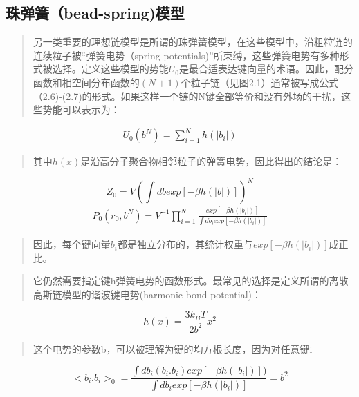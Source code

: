 \subsection{珠弹簧（bead-spring)模型}
			\begin{quotation}
				另一类重要的理想链模型是所谓的珠弹簧模型，在这些模型中，沿粗粒链的连续粒子被“弹簧电势（spring potentials)”所束缚，这些弹簧电势有多种形式被选择。定义这些模型的势能$U_{0}$是最合适表达键向量的术语。因此，配分函数和相空间分布函数的$(N+1)$个粒子链（见图2.1）通常被写成公式（2.6)-(2.7)的形式。如果这样一个链的N键全部等价和没有外场的干扰，这些势能可以表示为：
			\end{quotation} 
			\begin{equation}
			\begin{split}
			U_{0}(b^{N})= \sum_{i=1}^{N}h(|b_{i}|)
			\end{split}
			\end{equation}
			\begin{quotation}
				其中$h(x)$是沿高分子聚合物相邻粒子的弹簧电势，因此得出的结论是：
			\end{quotation}
			\begin{equation}
			Z_{0}=V(\int db exp[-\beta h(|b|)])^N 
			\end{equation}
			\begin{equation}
			\begin{split}		
			P_{0} (r_{0},b^N) =V^{-1} \prod_{i=1}^{N} \frac{exp[-\beta h(|b_{i}|)]}{\int d b_{i}exp[-\beta h(|b_{i}|)]}
			\end{split}
			\end{equation}
			\begin{quotation}
				因此，每个键向量$b_{i}$都是独立分布的，其统计权重与$exp[-\beta h(|b_{i}|)]$成正比。 
			\end{quotation}
			\begin{quotation}
				它仍然需要指定键h弹簧电势的函数形式。最常见的选择是定义所谓的离散高斯链模型的谐波键电势(harmonic bond potential)： 
			\end{quotation}
			\begin{equation}
			h(x)=\frac{3k_{B}T}{2b^2} x^2  
			\end{equation}
			\begin{quotation}
				这个电势的参数b，可以被理解为键的均方根长度，因为对任意键i 
			\end{quotation}
			\begin{equation}
			<b_{i}.b_{i}>_{0}= \frac{\int db_{i}(b_{i}.b_{i})exp[-\beta h(|b_{i}|)])}{\int db_{i}exp[-\beta h(|b_{i}|)]}=b^2
			\end{equation}

